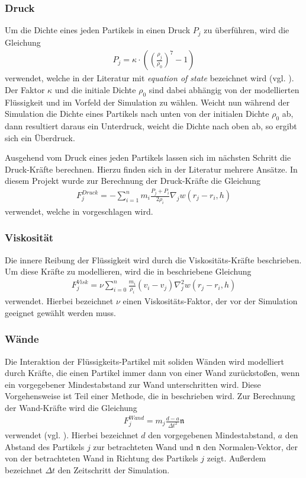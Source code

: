 \subsubsection*{Druck}
Um die Dichte eines jeden Partikels in einen Druck $P_j$ zu überführen, wird die Gleichung
\begin{align}\label{eos}
P_j = \kappa\cdot\left(\left(\frac{\rho_j}{\rho_0}\right)^7 - 1\right)
\end{align}
verwendet, welche in der Literatur mit \emph{equation of state} bezeichnet wird (vgl. \cite[S. 401]{FlowSPH}). Der Faktor $\kappa$ und die initiale Dichte $\rho_0$ sind dabei abhängig von der modellierten Flüssigkeit und im Vorfeld der Simulation zu wählen. Weicht nun während der Simulation die Dichte eines Partikels nach unten von der initialen Dichte $\rho_0$ ab, dann resultiert daraus ein Unterdruck, weicht die Dichte nach oben ab, so ergibt sich ein Überdruck.
\medskip

\noindent Ausgehend vom Druck eines jeden Partikels lassen sich im nächsten Schritt die Druck-Kräfte berechnen. Hierzu finden sich in der Literatur mehrere Ansätze. In diesem Projekt wurde zur Berechnung der Druck-Kräfte die Gleichung
\begin{align}\label{pressure}
F_j^{Druck} = -\sum_{i=1}^n m_i \frac{P_j + P_i}{2\rho_i} \nabla_j w(r_j - r_i, h)
\end{align}
verwendet, welche in \cite[S. 156]{FluidSim} vorgeschlagen wird.
\medskip

\subsubsection*{Viskosität}
Die innere Reibung der Flüssigkeit wird durch die Viskositäts-Kräfte beschrieben. Um diese Kräfte zu modellieren, wird die in \cite[S. 156]{FluidSim} beschriebene Gleichung
\begin{align}\label{viscosity}
F_j^{Visk} = \nu \sum_{i=0}^n \frac{m_i}{\rho_i} (v_i - v_j) \nabla_j^2 w(r_j - r_i, h)
\end{align}
verwendet. Hierbei bezeichnet $\nu$ einen Viskositäts-Faktor, der vor der Simulation geeignet gewählt werden muss.
\medskip

\subsubsection*{Wände}
Die Interaktion der Flüssigkeits-Partikel mit soliden Wänden wird modelliert durch Kräfte, die einen Partikel immer dann von einer Wand zurückstoßen, wenn ein vorgegebener Mindestabstand zur Wand unterschritten wird. Diese Vorgehensweise ist Teil einer Methode, die in \cite{BoundarySPH} beschrieben wird. Zur Berechnung der Wand-Kräfte wird die Gleichung
\begin{align}\label{boundary}
F_j^{Wand} = m_j\frac{d - a}{{\Delta t}^2} \mathfrak{n}
\end{align}
verwendet (vgl. \cite[Gleichung 26]{BoundarySPH}). Hierbei bezeichnet $d$ den vorgegebenen Mindestabstand, $a$ den Abstand des Partikels $j$ zur betrachteten Wand und $\mathfrak{n}$ den Normalen-Vektor, der von der betrachteten Wand in Richtung des Partikels $j$ zeigt. Außerdem bezeichnet $\Delta t$ den Zeitschritt der Simulation.
\medskip

